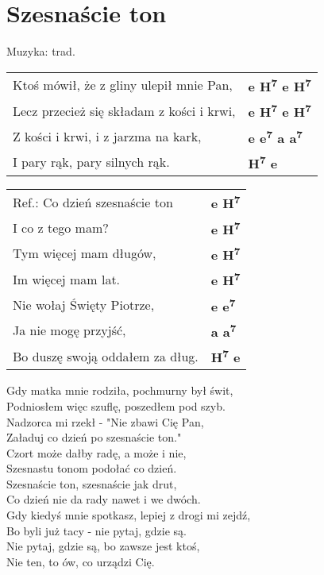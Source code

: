 \section{Szesnaście ton}

Muzyka:  trad.\\

\vspace{2em}
\begin{tabular}{@{}p{9cm}@{}l@{}}
Ktoś mówił, że z gliny ulepił mnie Pan, & \bfseries e H\textsuperscript{7} e H\textsuperscript{7} \\
Lecz przecież się składam z kości i krwi, & \bfseries e H\textsuperscript{7} e H\textsuperscript{7} \\
Z kości i krwi, i z jarzma na kark, & \bfseries e e\textsuperscript{7} a a\textsuperscript{7} \\
I pary rąk, pary silnych rąk. & \bfseries H\textsuperscript{7} e \\
\end{tabular}

\vspace{1em}
\begin{tabular}{@{}p{9cm}@{}l@{}}
Ref.: Co dzień szesnaście ton & \bfseries  e H\textsuperscript{7} \\
I co z tego mam? & \bfseries  e H\textsuperscript{7} \\
Tym więcej mam długów, & \bfseries  e H\textsuperscript{7} \\
Im więcej mam lat. & \bfseries  e H\textsuperscript{7} \\
Nie wołaj Święty Piotrze, & \bfseries  e e\textsuperscript{7} \\
Ja nie mogę przyjść, & \bfseries  a a\textsuperscript{7} \\
Bo duszę swoją oddałem za dług. & \bfseries  H\textsuperscript{7} e \\
\end{tabular}

\vspace{1em}
Gdy matka mnie rodziła, pochmurny był świt, \\
Podniosłem więc szuflę, poszedłem pod szyb. \\
Nadzorca mi rzekł - "Nie zbawi Cię Pan, \\
Załaduj co dzień po szesnaście ton." \\

Czort może dałby radę, a może i nie, \\
Szesnastu tonom podołać co dzień. \\
Szesnaście ton, szesnaście jak drut, \\
Co dzień nie da rady nawet i we dwóch. \\

Gdy kiedyś mnie spotkasz, lepiej z drogi mi zejdź, \\
Bo byli już tacy - nie pytaj, gdzie są. \\
Nie pytaj, gdzie są, bo zawsze jest ktoś, \\
Nie ten, to ów, co urządzi Cię. \\
